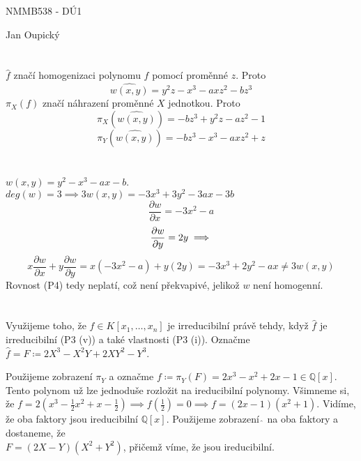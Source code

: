 \documentclass[12pt, a4paper]{article}
\begin{document}
\begin{center}
\large NMMB538 - DÚ1

\normalsize Jan Oupický
\end{center}
\vspace{1\baselineskip}

\section{}
$\hat{f}$ značí homogenizaci polynomu $f$ pomocí proměnné $z$. Proto
\[
\widehat{w(x,y)} = y^2 z - x^3 - a x z^2 - b z^3
\]
$\pi_X(f)$ značí náhrazení proměnné $X$ jednotkou. Proto
\[
\pi_X(\widehat{w(x,y)}) = - b z^3 + y^2 z - az^2 - 1
\]
\[
\pi_Y(\widehat{w(x,y)}) = - b z^3 - x^3 - a x z^2 + z
\]

\section{}
$w(x,y) = y^2-x^3-ax-b$. $deg(w) = 3 \implies 3w(x,y) = -3x^3+3y^2-3ax-3b$
\[
\frac{\partial w}{\partial x} = -3x^2-a
\]
\[
\frac{\partial w}{\partial y} = 2y\\\implies
\]
\[
x\frac{\partial w}{\partial x} + y\frac{\partial w}{\partial y} = x(-3x^2-a)+y(2y) = -3x^3+2y^2-ax \neq 3w(x,y)
\]
Rovnost (P4) tedy neplatí, což není překvapivé, jelikož $w$ není homogenní.

\section{}
Využijeme toho, že $f \in K[x_1,\dots,x_n]$ je irreducibilní právě tehdy, když $\hat{f}$ je irreducibilní (P3 (v)) a také vlastnosti (P3 (i)). Označme $\hat{f} = F \coloneqq 2X^3-X^2Y+2XY^2-Y^3$. 

Použijeme zobrazení $\pi_Y$ a označme $f \coloneqq \pi_Y(F) = 2x^3-x^2+2x-1 \in \mathbb{Q}[x]$. Tento polynom už lze jednoduše rozložit na ireducibilní polynomy. Všimneme si, že $f = 2(x^3-\frac{1}{2}x^2+x-\frac{1}{2}) \implies f(\frac{1}{2}) = 0 \implies f = (2x-1)(x^2+1)$. Vidíme, že oba faktory jsou ireducibilní $\mathbb{Q}[x]$. Použijeme zobrazení $\hat{\,}$ na oba faktory a dostaneme, že\\ $F = (2X-Y)(X^2+Y^2)$, přičemž víme, že jsou ireducibilní.
\end{document}
